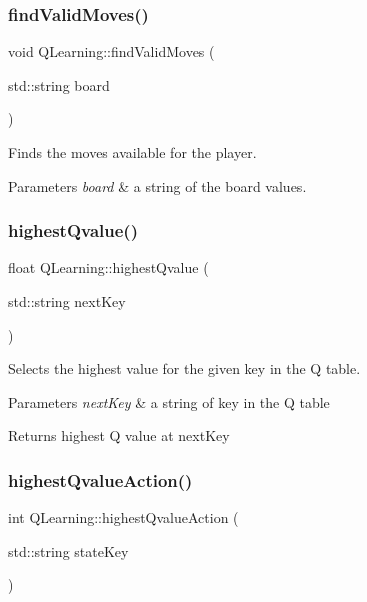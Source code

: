 \subsubsection{\texorpdfstring{find\+Valid\+Moves()}{findValidMoves()}}
{\footnotesize\ttfamily void Q\+Learning\+::find\+Valid\+Moves (\begin{DoxyParamCaption}\item[{std\+::string}]{board }\end{DoxyParamCaption})}



Finds the moves available for the player. 


\begin{DoxyParams}{Parameters}
{\em board} & a string of the board values. \\
\hline
\end{DoxyParams}
\mbox{\label{classQLearning_a0e5da71daa52de437939616fe539b2ba}} 
\subsubsection{\texorpdfstring{highest\+Qvalue()}{highestQvalue()}}
{\footnotesize\ttfamily float Q\+Learning\+::highest\+Qvalue (\begin{DoxyParamCaption}\item[{std\+::string}]{next\+Key }\end{DoxyParamCaption})}



Selects the highest value for the given key in the Q table. 


\begin{DoxyParams}{Parameters}
{\em next\+Key} & a string of key in the Q table \\
\hline
\end{DoxyParams}
\begin{DoxyReturn}{Returns}
highest Q value at next\+Key 
\end{DoxyReturn}
\mbox{\label{classQLearning_a5bf153ecf20717e883b780204e045a09}} 
\subsubsection{\texorpdfstring{highest\+Qvalue\+Action()}{highestQvalueAction()}}
{\footnotesize\ttfamily int Q\+Learning\+::highest\+Qvalue\+Action (\begin{DoxyParamCaption}\item[{std\+::string}]{state\+Key }\end{DoxyParamCaption})}



